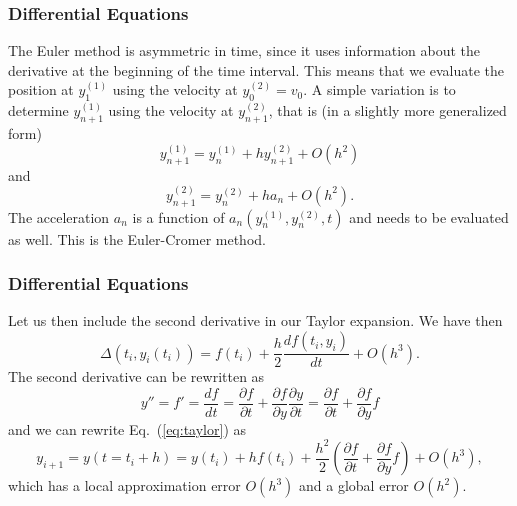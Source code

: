 \documentclass{beamer}
\begin{document}
\begin{frame}
\frametitle{Differential Equations}

\begin{block}{}
The Euler method is asymmetric in time, since it uses information about the derivative at the beginning
of the time interval. This means that we evaluate the position at $y^{(1)}_1$ using the velocity
at $y^{(2)}_0=v_0$. A simple variation is to determine $y^{(1)}_{n+1}$ using the velocity at
$y^{(2)}_{n+1}$, that is (in a slightly more generalized form)
\begin{equation} 
   y^{(1)}_{n+1}=y^{(1)}_{n}+h y^{(2)}_{n+1}+O(h^2)
\end{equation}
and 
\begin{equation}
   y^{(2)}_{n+1}=y^{(2)}_{n}+h a_{n}+O(h^2).
\end{equation}
The acceleration $a_n$ is a function of $a_n(y^{(1)}_{n}, y^{(2)}_{n},t)$ and needs to be evaluated
as well. This is the Euler-Cromer method.
\end{block}
\end{frame}

\begin{frame}
\frametitle{Differential Equations}

\begin{block}{}
Let us then include the second derivative in our Taylor expansion. 
We have then
\begin{equation}
 \Delta(t_i,y_i(t_i))=f(t_i)+\frac{h}{2}\frac{df(t_i,y_i)}{dt}+O(h^3).
\end{equation}
The second derivative can be rewritten as
\begin{equation}
  y''=f'=\frac{df}{dt}=\frac{\partial f}{\partial t}+\frac{\partial f}{\partial y}\frac{\partial y}{\partial t}=\frac{\partial f}{\partial t}+\frac{\partial f}{\partial y}f \label{eq:derivatives}
\end{equation}
and we can rewrite Eq.\ (\ref{eq:taylor}) as 
\begin{equation}
     y_{i+1}=y(t=t_i+h)=y(t_i) +hf(t_i)+
     \frac{h^2}{2}\left(\frac{\partial f}{\partial t}+\frac{\partial f}{\partial y}f\right) + O(h^{3  }),
\end{equation}
which has a local approximation error $O(h^{3  })$ and a global
error $O(h^{2})$.
\end{block}
\end{frame}
\end{document}
